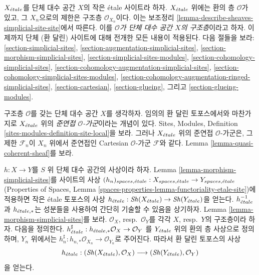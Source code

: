 \medskip\noindent
$X_{\acute{e}tale}$를 단체 대수 공간 $X$의 작은 \'etale 사이트라 하자.
$X_{\acute{e}tale}$ 위에는 환의 층 $\mathcal{O}$가 있고, 그 $X_n$으로의
제한은 구조층 $\mathcal{O}_{X_n}$이다. 이는 보조정리
\ref{lemma-describe-sheaves-simplicial-site-site}에서 따른다.
이를 {\it $\mathcal{O}$가 단체 대수 공간 $X$의 구조층}이라고 하자.
이제까지 단체 (환 달린) 사이트에 대해 전개한 모든 내용이 적용된다.
다음 절들을 보라:
\ref{section-simplicial-sites},
\ref{section-augmentation-simplicial-sites},
\ref{section-morphism-simplicial-sites},
\ref{section-simplicial-sites-modules},
\ref{section-cohomology-simplicial-sites},
\ref{section-cohomology-augmentation-simplicial-sites},
\ref{section-cohomology-simplicial-sites-modules},
\ref{section-cohomology-augmentation-ringed-simplicial-sites},
\ref{section-cartesian},
\ref{section-glueing}, 그리고
\ref{section-glueing-modules}.

\medskip\noindent
구조층 $\mathcal{O}$를 갖는 단체 대수 공간 $X$를 생각하자.
임의의 환 달린 토포스에서와 마찬가지로 $X_{\acute{e}tale}$ 위의
{\it 준연접 $\mathcal{O}$-가군}이라는 개념이 있다. Sites, Modules,
Definition \ref{sites-modules-definition-site-local}을 보라.
그러나 $X_{\acute{e}tale}$ 위의 준연접 $\mathcal{O}$-가군은,
그 제한 $\mathcal{F}_n$이 $X_n$ 위에서 준연접인
Cartesian $\mathcal{O}$-가군 $\mathcal{F}$와 같다. Lemma
\ref{lemma-quasi-coherent-sheaf}를 보라.

\medskip\noindent
$h : X \to Y$를 $S$ 위 단체 대수 공간의 사상이라 하자.
Lemma \ref{lemma-morphism-simplicial-sites}를 사이트의 사상
$(h_n)_{spaces, {\acute{e}tale}} : X_{spaces, {\acute{e}tale}} \to Y_{spaces, {\acute{e}tale}}$
(Properties of Spaces, Lemma
\ref{spaces-properties-lemma-functoriality-etale-site})에 적용하면
작은 \'etale 토포스의 사상
$h_{\acute{e}tale} : \mathop{\mathit{Sh}}\nolimits(X_{\acute{e}tale}) \to \mathop{\mathit{Sh}}\nolimits(Y_{\acute{e}tale})$을 얻는다.
$h_{\acute{e}tale}^{-1}$과 $h_{{\acute{e}tale}, *}$는 성분들을 사용하여 간단히
기술할 수 있음을 상기하자. Lemma
\ref{lemma-morphism-simplicial-sites}를 보라.
$\mathcal{O}_X$, resp.\ $\mathcal{O}_Y$를 각각 $X$, resp.\ $Y$의
구조층이라 하자. 다음을 정의한다.
$h_{\acute{e}tale}^\sharp : h_{{\acute{e}tale}, *}\mathcal{O}_X \to \mathcal{O}_Y$
를 $Y_{\acute{e}tale}$ 위의 환의 층 사상으로 정의하며, $Y_n$ 위에서는
$h_n^\sharp : h_{n, *}\mathcal{O}_{X_n} \to \mathcal{O}_{Y_n}$로
주어진다. 따라서 환 달린 토포스의 사상
$$
h_{\acute{e}tale} :
(\mathop{\mathit{Sh}}\nolimits(X_{\acute{e}tale}), \mathcal{O}_X)
\longrightarrow
(\mathop{\mathit{Sh}}\nolimits(Y_{\acute{e}tale}), \mathcal{O}_Y)
$$
을 얻는다.

